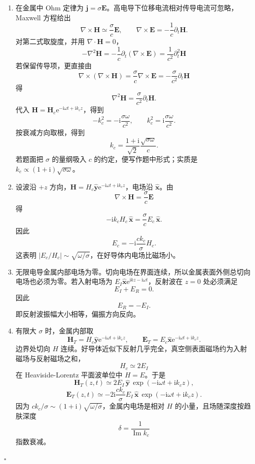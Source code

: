 \documentclass[UTF8,12pt]{ctexart}
\newcommand{\ii}{\mathrm i}
\newcommand{\ee}{\mathrm e}
\newenvironment{solution}{%
  \par\medskip
  \noindent{\bfseries 解答}\quad\ignorespaces
}{\hfill$\square$\par\medskip}
\begin{document}
\begin{solution}
\begin{enumerate}[label=(\alph*)]
\item 在金属中 Ohm 定律为 \(\bm j=\sigma\bm E\)。高电导下位移电流相对传导电流可忽略，Maxwell 方程给出
\[
\nabla\times\bm H\simeq \frac{\sigma}{c}\bm E,\qquad
\nabla\times\bm E=-\frac1c\partial_t\bm H.
\]
对第二式取旋度，并用 \(\nabla\cdot\bm H=0\)，
\[
-\nabla^2\bm H
=-\frac1c\partial_t(\nabla\times\bm E)
=\frac1{c^2}\partial_t^2\bm H
\]
若保留传导项，更直接由
\[
\nabla\times(\nabla\times\bm H)
=\frac{\sigma}{c}\nabla\times\bm E
=-\frac{\sigma}{c^2}\partial_t\bm H
\]
得
\[
\nabla^2\bm H=\frac{\sigma}{c^2}\partial_t\bm H.
\]
代入 \(\bm H=\bm H_c\ee^{-\ii\omega t+\ii k_cz}\)，得到
\[
-k_c^2=-\ii\frac{\sigma\omega}{c^2},
\qquad
k_c^2=\ii\frac{\sigma\omega}{c^2}.
\]
按衰减方向取根，得到
\[
k_c=\frac{1+\ii}{\sqrt2}\frac{\sqrt{\sigma\omega}}{c}.
\]
若题面把 \(\sigma\) 的量纲吸入 \(c\) 的约定，便写作题中形式；实质是 \(k_c\propto(1+\ii)\sqrt{\sigma\omega}\)。

\item 设波沿 \(+z\) 方向，\(\bm H=H_c\hat{\bm y}\ee^{-\ii\omega t+\ii k_cz}\)，电场沿 \(\hat{\bm x}\)。由
\[
\nabla\times\bm H=\frac{\sigma}{c}\bm E
\]
得
\[
-\ii k_cH_c\,\hat{\bm x}=\frac{\sigma}{c}E_c\,\hat{\bm x}.
\]
因此
\[
E_c=-\ii\frac{c k_c}{\sigma}H_c.
\]
这表明 \(|E_c/H_c|\sim \sqrt{\omega/\sigma}\)，在好导体内电场比磁场小。

\item 无限电导金属内部电场为零。切向电场在界面连续，所以金属表面外侧总切向电场也必须为零。若入射电场为 \(E_I\hat{\bm x}\ee^{\ii kz-\ii\omega t}\)，反射波在 \(z=0\) 处必须满足
\[
E_I+E_R=0.
\]
因此
\[
E_R=-E_I.
\]
即反射波振幅大小相等，偏振方向反向。

\item 有限大 \(\sigma\) 时，金属内部取
\[
\bm H_T=H_c\hat{\bm y}\ee^{-\ii\omega t+\ii k_cz},\qquad
\bm E_T=E_c\hat{\bm x}\ee^{-\ii\omega t+\ii k_cz}.
\]
边界处切向 \(H\) 连续。好导体近似下反射几乎完全，真空侧表面磁场约为入射磁场与反射磁场之和，
\[
H_c\simeq 2E_I
\]
在 Heaviside-Lorentz 平面波单位中 \(H=E\)。于是
\[
\bm H_T(z,t)\simeq 2E_I\,\hat{\bm y}\,
\exp(-\ii\omega t+\ii k_cz),
\]
\[
\bm E_T(z,t)
\simeq -2\ii\frac{ck_c}{\sigma}E_I\,\hat{\bm x}\,
\exp(-\ii\omega t+\ii k_cz).
\]
因为 \(ck_c/\sigma\sim (1+\ii)\sqrt{\omega/\sigma}\)，金属内电场是相对 \(H\) 的小量，且场随深度按趋肤深度
\[
\delta=\frac1{\operatorname{Im}k_c}
\]
指数衰减。
\end{enumerate}
\end{solution}
\end{document}
